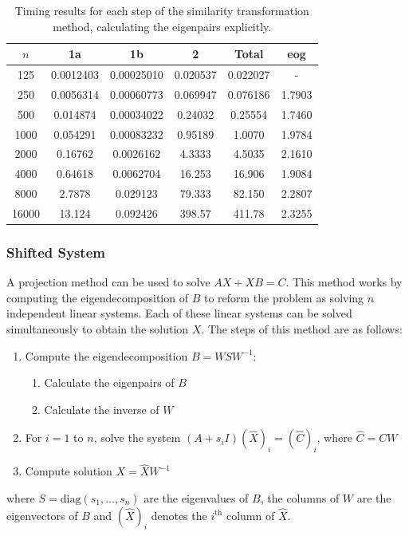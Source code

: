 \documentclass[11pt]{article}
\numberwithin{equation}{section}
\begin{document}
\begin{table}[H]
\centering
\begin{tabular}{|c|c|c|c|c|c|}
\hline
$n$ & 1a & 1b & 2 & Total & eog \\
\hline
125 & 0.0012403 & 0.00025010 & 0.020537 & 0.022027 & - \\
250 & 0.0056314 & 0.00060773 & 0.069947 & 0.076186 & 1.7903 \\
500 & 0.014874 & 0.00034022 & 0.24032 & 0.25554 & 1.7460 \\
1000 & 0.054291 & 0.00083232 & 0.95189 & 1.0070 & 1.9784 \\
2000 & 0.16762 & 0.0026162 & 4.3333 & 4.5035 & 2.1610 \\
4000 & 0.64618 & 0.0062704 & 16.253 & 16.906 & 1.9084 \\
8000 & 2.7878 & 0.029123 & 79.333 & 82.150 & 2.2807 \\
16000 & 13.124 & 0.092426 & 398.57 & 411.78 & 2.3255 \\
\hline
\end{tabular}
\captionsetup{justification=centering}
\caption{Timing results for each step of the similarity transformation method, calculating the eigenpairs explicitly.}
\label{table:sim trans explicit steps}
\end{table}

\subsubsection{Shifted System}
A projection method \cite{Simoncini} can be used to solve $AX + XB = C$. This method works by computing the eigendecomposition of $B$ to reform the problem as solving $n$ independent linear systems. Each of these linear systems can be solved simultaneously to obtain the solution $X$. The steps of this method are as follows:
\begin{enumerate}
\item Compute the eigendecomposition $B = WSW^{-1}$:
	\begin{enumerate}
	\item Calculate the eigenpairs of $B$
	\item Calculate the inverse of $W$
	\end{enumerate}
\item For $i=1$ to $n$, solve the system $(A+s_i I)(\hat{X})_i = (\hat{C})_i$, where $\hat{C} = CW$
\item Compute solution $X = \hat{X}W^{-1}$
\end{enumerate}
where $S = \text{diag}(s_1, \dots, s_n)$ are the eigenvalues of $B$, the columns of $W$ are the eigenvectors of $B$ and $(\hat{X})_i$ denotes the $i^{\text{th}}$ column of $\hat{X}$.
\end{document}

